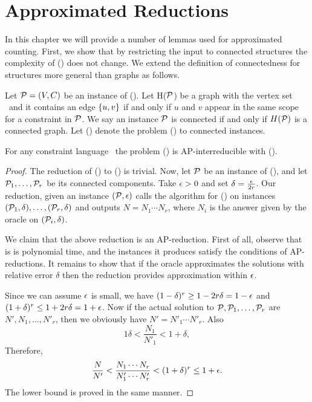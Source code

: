 \chapter{Approximated Reductions}
In this chapter we will provide a number of lemmas used for approximated counting. 
First, we show that by restricting the input to connected structures the complexity of 
\ccsp(\mrelset) does not change. We extend the definition of connectedness for structures more general 
than graphs as follows.

Let \(\mathcal{P} = (V, C)\) be an instance of \ccsp(\mrelset)\@. Let H(\(\mathcal{P}\)) be a graph
with the vertex set \mV\ and it contains an edge \(\{u,v\}\) if and only if 
\(u\) and \(v\) appear in the same scope for a constraint in \(\mathcal{P}\)\@.
We say an instance \(\mathcal{P}\) is connected if and only if \(H(\mathcal{P})\) is a connected graph.
Let \cccsp(\mrelset) denote the problem \ccsp(\mrelset) to connected instances.

\begin{lemma} \label{lemma:connected}
For any constraint language \mrelset\ the problem \ccsp(\mrelset) is AP-interreducible with
\cccsp(\mrelset)\@.
\end{lemma}

\begin{proof}
The reduction of \cccsp(\mrelset) to \ccsp(\mrelset) is trivial. Now, let \(\mathcal{P}\) be an instance of
\ccsp(\mrelset), and let \(\mathcal{P}_1,\dotsc,\mathcal{P}_r\) be its connected components. Take \(\epsilon > 0\) 
and set \(\delta = \frac{\epsilon}{2r}\)\@. Our reduction, given an instance \((\mathcal{P},\epsilon)\) calls
the algorithm for \cccsp(\mrelset) on instances \((\mathcal{P}_1,\delta), \dotsc,(\mathcal{P}_r,\delta)\) 
and outputs \(N = N_1 \dotsm N_r\),
where \(N_i\) is the answer given by the oracle on \((\mathcal{P}_i,\delta)\)\@.

We claim that the above reduction is an AP-reduction. First of all, observe that is is polynomial
time, and the instances it produces satisfy the conditions of AP-reductions. It remains to show
that if the oracle approximates the solutions with relative error \(\delta\) then the reduction 
provides approximation within \(\epsilon\)\@.

Since we can assume \(\epsilon\) is small, we have \((1 - \delta)^r \ge 1 - 2r\delta = 1 - \epsilon \) and
\( ( 1 + \delta)^r \le 1 + 2r\delta = 1 + \epsilon\)\@. Now if 
the actual solution to \(\mathcal{P}, \mathcal{P}_1,\dotsc,\mathcal{P}_r\) are \(N',N_1,\dotsc,N'_r\), then 
we obviously have \(N'=N'_1\dotsm N'_r\)\@. Also
\[1\delta < \frac{N_1}{N'_1} < 1 + \delta,\]
Therefore,
\[\frac{N}{N'} < \frac{N_1 \dotsm N_r}{N'_1\dotsm N'_r} < (1 + \delta)^r \le 1 + \epsilon.\]
The lower bound is proved in the same manner.
\end{proof}

